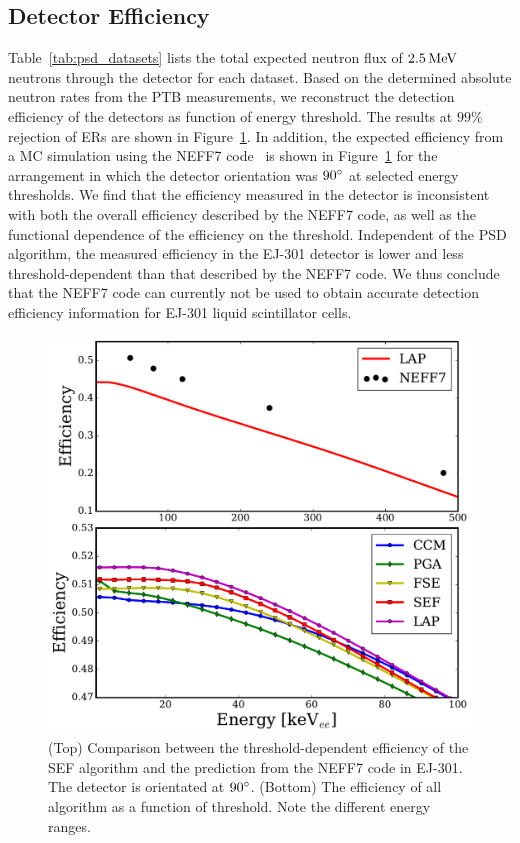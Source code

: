 \subsection{Detector Efficiency}

Table~\ref{tab:psd_datasets} lists the total expected neutron flux of $2.5\,\mathrm{MeV}$ neutrons through the detector for each dataset. Based on the determined absolute neutron rates from the PTB measurements, we reconstruct the detection efficiency of the detectors as function of energy threshold. The results at $99\%$ rejection of ERs are shown in Figure~\ref{fig:psd_efficiencies}. In addition, the expected efficiency from a MC simulation using the NEFF7 code~\cite{Dietze:1982} is shown in Figure~\ref{fig:psd_efficiencies} for the arrangement in which the detector orientation was $90{}^{\circ}$ at selected energy thresholds. We find that the efficiency measured in the detector is inconsistent with both the overall efficiency described by the NEFF7 code, as well as the functional dependence of the efficiency on the threshold. Independent of the PSD algorithm, the measured efficiency in the EJ-301 detector is lower and less threshold-dependent than that described by the NEFF7 code. We thus conclude that the NEFF7 code can currently not be used to obtain accurate detection efficiency information for EJ-301 liquid scintillator cells.

\begin{figure}[htbp]
\centering
    \includegraphics[width = \textwidth]{figures/psd/fig_efficiency}
    \caption{(Top) Comparison between the threshold-dependent efficiency of the SEF algorithm and the prediction from the NEFF7 code in EJ-301. The detector is orientated at $90{}^{\circ}$. (Bottom) The efficiency of all algorithm as a function of threshold. Note the different energy ranges.}\label{fig:psd_efficiencies}
\end{figure}

